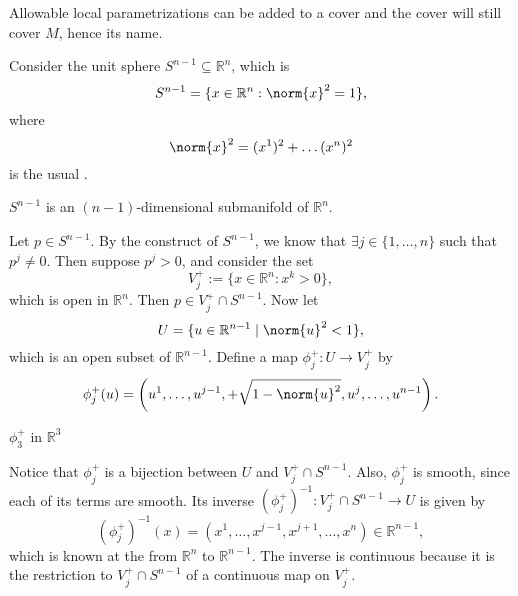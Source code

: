 \documentclass[notoc,notitlepage]{tufte-book}
\begin{document}
\begin{note}
  Allowable local parametrizations can be added to a cover and the cover will
  still cover $M$, hence its name.
\end{note}

\begin{eg}\label{eg:parametrization_of_s_n_1_in_r_n_no1}
  Consider the unit sphere $S^{n - 1} \subseteq \mathbb{R}^n$, which is
  \begin{equation*}
    S^{n - 1} = \{ x \in \mathbb{R}^n : \norm{x}^2 = 1 \},
  \end{equation*}
  where
  \begin{equation*}
    \norm{x}^2 = (x^1)^2 + \hdots (x^n)^2
  \end{equation*}
  is the usual  .

   $S^{n - 1}$ is an $(n - 1)$-dimensional submanifold of
  $\mathbb{R}^n$.

  Let $p \in S^{n - 1}$. By the construct of $S^{n - 1}$, we know that $\exists j
  \in \{ 1, \ldots, n \}$ such that $p^j \neq 0$. Then suppose $p^j > 0$, and
  consider the set
  \begin{equation*}
    V_j^+ := \{ x \in \mathbb{R}^n : x^k > 0 \},
  \end{equation*}
  which is open in $\mathbb{R}^n$. Then $p \in V_j^+ \cap S^{n - 1}$. Now let
  \begin{equation*}
    U = \{ u \in \mathbb{R}^{n - 1} \mid \norm{u}^2 < 1 \},
  \end{equation*}
  which is an open subset of $\mathbb{R}^{n - 1}$. Define a map $\phi_j^+ : U
  \to V_j^+$ by
  \begin{equation*}
    \phi_j^+(u) = \left( u^1, \ldots, u^{j - 1}, + \sqrt{1 - \norm{u}^2}, u^j,
    \ldots, u^{n - 1} \right).
  \end{equation*}
  \begin{marginfigure}
    \centering
    \caption{$\phi_3^+$ in $\mathbb{R}^3$}\label{fig:_phi_3_in_r_3_}
  \end{marginfigure}
  Notice that $\phi_j^+$ is a bijection between $U$ and $V_j^+ \cap S^{n - 1}$.
  Also, $\phi_j^+$ is smooth, since each of its terms are smooth. Its inverse
  $(\phi_j^+)^{-1} : V_j^+ \cap S^{n - 1} \to U$ is given by
  \begin{equation*}
    ( \phi_j^+)^{-1}(x) = (x^1, \ldots, x^{j - 1}, x^{j + 1}, \ldots, x^n) \in
    \mathbb{R}^{n - 1},
  \end{equation*}
  which is known at the  from $\mathbb{R}^n$ to
  $\mathbb{R}^{n - 1}$. The inverse is continuous because it is the restriction
  to $V_j^+ \cap S^{n - 1}$ of a continuous map on $V_j^+$.


\end{eg}
\end{document}
